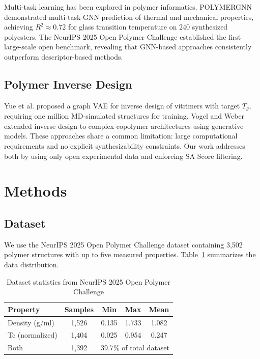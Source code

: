 \documentclass{article}
\begin{document}
Multi-task learning has been explored in polymer informatics.
POLYMERGNN \citep{polymergnn_2023} demonstrated multi-task GNN prediction
of thermal and mechanical properties, achieving $R^2 \approx 0.72$ for glass
transition temperature on 240 synthesized polyesters.
The NeurIPS 2025 Open Polymer Challenge \citep{neurips_opc_2025} established
the first large-scale open benchmark, revealing that GNN-based approaches
consistently outperform descriptor-based methods.

\subsection{Polymer Inverse Design}

Yue et al. \citep{vitrimer_inverse_2023} proposed a graph VAE for inverse design of vitrimers
with target $T_g$, requiring one million MD-simulated structures for training.
Vogel and Weber \citep{copolymer_inverse_2024} extended inverse design to complex copolymer
architectures using generative models.
These approaches share a common limitation: large computational requirements
and no explicit synthesizability constraints. Our work addresses both by using
only open experimental data and enforcing SA Score filtering.

\section{Methods}

\subsection{Dataset}

We use the NeurIPS 2025 Open Polymer Challenge dataset \citep{neurips_opc_2025}
containing 3,502 polymer structures with up to five measured properties.
Table~\ref{tab:dataset} summarizes the data distribution.

\begin{table}[h]
\centering
\caption{Dataset statistics from NeurIPS 2025 Open Polymer Challenge}
\label{tab:dataset}
\begin{tabular}{lcccc}
\toprule
Property & Samples & Min & Max & Mean \\
\midrule
Density (g/ml) & 1,526 & 0.135 & 1.733 & 1.082 \\
Tc (normalized) & 1,404 & 0.025 & 0.954 & 0.247 \\
Both & 1,392 & \multicolumn{3}{c}{39.7\% of total dataset} \\
\bottomrule
\end{tabular}
\end{table}
\end{document}
